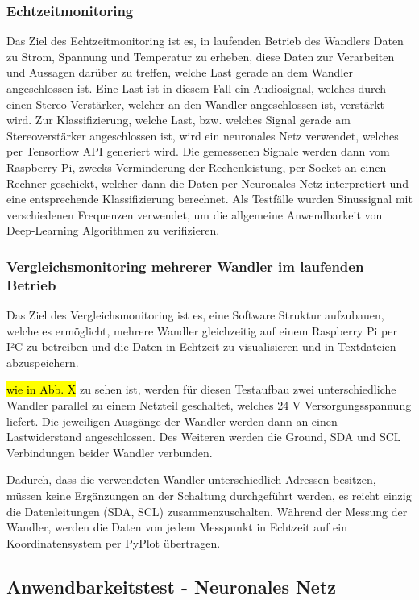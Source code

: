 \subsubsection{Echtzeitmonitoring}
Das Ziel des Echtzeitmonitoring ist es, in laufenden Betrieb des Wandlers Daten zu Strom, Spannung und Temperatur zu erheben, diese Daten zur Verarbeiten und Aussagen darüber zu treffen, welche Last gerade an dem Wandler angeschlossen ist. Eine Last ist in diesem Fall ein Audiosignal, welches durch einen Stereo Verstärker, welcher an den Wandler angeschlossen ist, verstärkt wird. 
Zur Klassifizierung, welche Last, bzw. welches Signal gerade am Stereoverstärker angeschlossen ist, wird ein neuronales Netz verwendet, welches per Tensorflow API generiert wird. Die gemessenen Signale werden dann vom Raspberry Pi, zwecks Verminderung der Rechenleistung, per Socket an einen Rechner geschickt, welcher dann die Daten per Neuronales Netz interpretiert und eine entsprechende Klassifizierung berechnet. Als Testfälle wurden Sinussignal mit verschiedenen Frequenzen verwendet, um die allgemeine Anwendbarkeit von Deep-Learning Algorithmen zu verifizieren. 

\subsubsection{Vergleichsmonitoring mehrerer Wandler im laufenden Betrieb}
Das Ziel des Vergleichsmonitoring ist es, eine Software Struktur aufzubauen, welche es ermöglicht, mehrere Wandler gleichzeitig auf einem Raspberry Pi per I²C zu betreiben und die Daten in Echtzeit zu visualisieren und in Textdateien abzuspeichern. 
 
\hl{wie in Abb. X} zu sehen ist, werden für diesen Testaufbau zwei unterschiedliche Wandler parallel zu einem Netzteil geschaltet, welches 24 V Versorgungsspannung liefert. Die jeweiligen Ausgänge der Wandler werden dann an einen Lastwiderstand angeschlossen. Des Weiteren werden die Ground, SDA und SCL Verbindungen beider Wandler verbunden.

Dadurch, dass die verwendeten Wandler unterschiedlich Adressen besitzen, müssen keine Ergänzungen an der Schaltung durchgeführt werden, es reicht einzig die Datenleitungen (SDA, SCL) zusammenzuschalten. Während der Messung der Wandler, werden die Daten von jedem Messpunkt in Echtzeit auf ein Koordinatensystem per PyPlot übertragen.

\subsection{Anwendbarkeitstest - Neuronales Netz}

